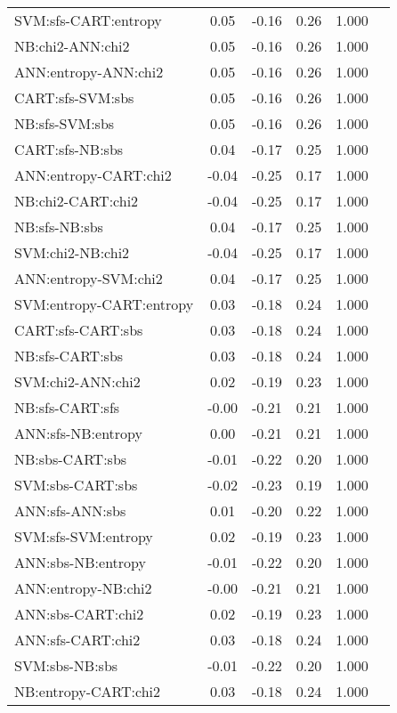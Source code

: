 \begin{center}
\begin{longtable}{|l|c|c|c|c|l}
     SVM:sfs-CART:entropy &   0.05 &  -0.16 &   0.26 &  1.000 &      \\
         NB:chi2-ANN:chi2 &   0.05 &  -0.16 &   0.26 &  1.000 &      \\
     ANN:entropy-ANN:chi2 &   0.05 &  -0.16 &   0.26 &  1.000 &      \\
         CART:sfs-SVM:sbs &   0.05 &  -0.16 &   0.26 &  1.000 &      \\
           NB:sfs-SVM:sbs &   0.05 &  -0.16 &   0.26 &  1.000 &      \\
          CART:sfs-NB:sbs &   0.04 &  -0.17 &   0.25 &  1.000 &      \\
    ANN:entropy-CART:chi2 &  -0.04 &  -0.25 &   0.17 &  1.000 &      \\
        NB:chi2-CART:chi2 &  -0.04 &  -0.25 &   0.17 &  1.000 &      \\
            NB:sfs-NB:sbs &   0.04 &  -0.17 &   0.25 &  1.000 &      \\
         SVM:chi2-NB:chi2 &  -0.04 &  -0.25 &   0.17 &  1.000 &      \\
     ANN:entropy-SVM:chi2 &   0.04 &  -0.17 &   0.25 &  1.000 &      \\
 SVM:entropy-CART:entropy &   0.03 &  -0.18 &   0.24 &  1.000 &      \\
        CART:sfs-CART:sbs &   0.03 &  -0.18 &   0.24 &  1.000 &      \\
          NB:sfs-CART:sbs &   0.03 &  -0.18 &   0.24 &  1.000 &      \\
        SVM:chi2-ANN:chi2 &   0.02 &  -0.19 &   0.23 &  1.000 &      \\
          NB:sfs-CART:sfs &  -0.00 &  -0.21 &   0.21 &  1.000 &      \\
       ANN:sfs-NB:entropy &   0.00 &  -0.21 &   0.21 &  1.000 &      \\
          NB:sbs-CART:sbs &  -0.01 &  -0.22 &   0.20 &  1.000 &      \\
         SVM:sbs-CART:sbs &  -0.02 &  -0.23 &   0.19 &  1.000 &      \\
          ANN:sfs-ANN:sbs &   0.01 &  -0.20 &   0.22 &  1.000 &      \\
      SVM:sfs-SVM:entropy &   0.02 &  -0.19 &   0.23 &  1.000 &      \\
       ANN:sbs-NB:entropy &  -0.01 &  -0.22 &   0.20 &  1.000 &      \\
      ANN:entropy-NB:chi2 &  -0.00 &  -0.21 &   0.21 &  1.000 &      \\
        ANN:sbs-CART:chi2 &   0.02 &  -0.19 &   0.23 &  1.000 &      \\
        ANN:sfs-CART:chi2 &   0.03 &  -0.18 &   0.24 &  1.000 &      \\
           SVM:sbs-NB:sbs &  -0.01 &  -0.22 &   0.20 &  1.000 &      \\
     NB:entropy-CART:chi2 &   0.03 &  -0.18 &   0.24 &  1.000 &      \\
\end{longtable}
\end{center}
